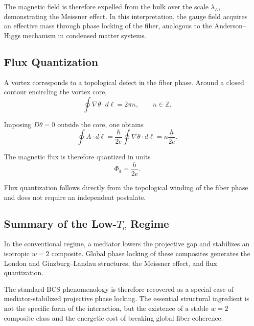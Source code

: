     The magnetic field is therefore expelled
    from the bulk over the scale $\lambda_L$,
    demonstrating the Meissner effect.
    In this interpretation,
    the gauge field acquires an effective mass
    through phase locking of the fiber,
    analogous to the Anderson--Higgs mechanism
    in condensed matter systems.

  \subsection{Flux Quantization}
    \label{subsec:flux-quantization}

    A vortex corresponds to a topological defect
    in the fiber phase.
    Around a closed contour encircling the vortex core,
    \begin{equation}
      \oint \nabla \theta \cdot d\ell
      =
      2\pi n,
      \qquad n \in \mathbb{Z}.
    \end{equation}

    Imposing $D\theta = 0$ outside the core,
    one obtains
    \begin{equation}
      \oint A \cdot d\ell
      =
      \frac{\hbar}{2e}
      \oint \nabla \theta \cdot d\ell
      =
      n \frac{h}{2e}.
    \end{equation}

    The magnetic flux is therefore quantized in units
    \begin{equation}
      \Phi_0
      =
      \frac{h}{2e}.
    \end{equation}

    Flux quantization follows directly
    from the topological winding of the fiber phase
    and does not require an independent postulate.

  \subsection{Summary of the Low-\texorpdfstring{$T_c$}{Tc} Regime}
    \label{subsec:lowTc-summary}

    In the conventional regime,
    a mediator lowers the projective gap
    and stabilizes an isotropic $w=2$ composite.
    Global phase locking of these composites
    generates the London and Ginzburg--Landau structures,
    the Meissner effect,
    and flux quantization.

    The standard BCS phenomenology
    is therefore recovered as a special case
    of mediator-stabilized projective phase locking.
    The essential structural ingredient
    is not the specific form of the interaction,
    but the existence of a stable $w=2$ composite class
    and the energetic cost of breaking global fiber coherence.
